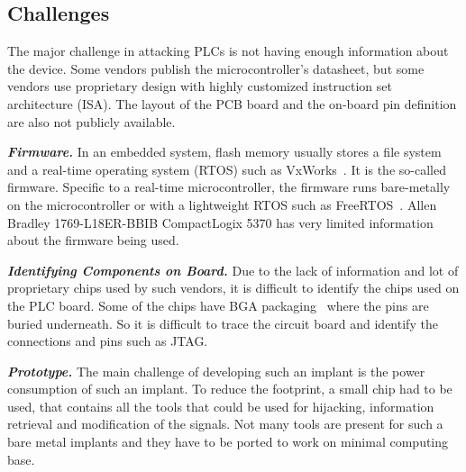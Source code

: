 \subsection{Challenges}

The major challenge in attacking PLCs is not having enough information about the device. Some vendors publish the microcontroller's datasheet, but some vendors use proprietary design with highly customized instruction set architecture (ISA).  The layout of the PCB board and the on-board pin definition are also not publicly available.


\textbf{\textit{Firmware.}} In an embedded system, flash memory usually stores a file system and a real-time operating system (RTOS) such as VxWorks~\cite{neugass1991vxworks}. It is the so-called firmware. Specific to a real-time microcontroller, the firmware runs bare-metally on the microcontroller or with a lightweight RTOS such as FreeRTOS~\cite{barry2008freertos}. Allen Bradley 1769-L18ER-BBIB CompactLogix 5370 has very limited information about the firmware being used. 

\textbf{\textit{Identifying Components on Board.}} Due to the lack of information and lot of proprietary chips used by such vendors, it is difficult to identify the chips used on the PLC board. Some of the chips have BGA packaging~\cite{joshi2000mosfet} where the pins are buried underneath. So it is difficult to trace the circuit board and identify the connections and pins such as JTAG. 

\textbf{\textit{Prototype.}} The main challenge of developing such an implant is the power consumption of such an implant. To reduce the footprint, a small chip had to be used, that contains all the tools that could be used for hijacking, information retrieval and modification of the signals. Not many tools are present for such a bare metal implants and they have to be ported to work on minimal computing base.   
